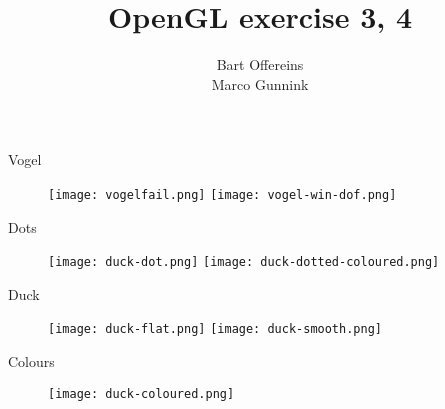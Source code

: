 \documentclass{beamer}
\author{Bart Offereins\\Marco Gunnink}
\title{OpenGL exercise 3, 4}
\begin{document}
\titlepage

\begin{frame}{Vogel}

   \begin{figure}[ht]
       \texttt{[image: vogelfail.png]} %
       \texttt{[image: vogel-win-dof.png]} %
    \end{figure}

\end{frame}

\begin{frame}{Dots}

   \begin{figure}[ht]
       \texttt{[image: duck-dot.png]} %
       \texttt{[image: duck-dotted-coloured.png]} %
    \end{figure}

\end{frame}

\begin{frame}{Duck}

   \begin{figure}[ht]
        \texttt{[image: duck-flat.png]} %
        \texttt{[image: duck-smooth.png]} %
    \end{figure}

\end{frame}

\begin{frame}{Colours}

   \begin{figure}[ht]
        \texttt{[image: duck-coloured.png]} %
    \end{figure}

\end{frame}
\end{document}
